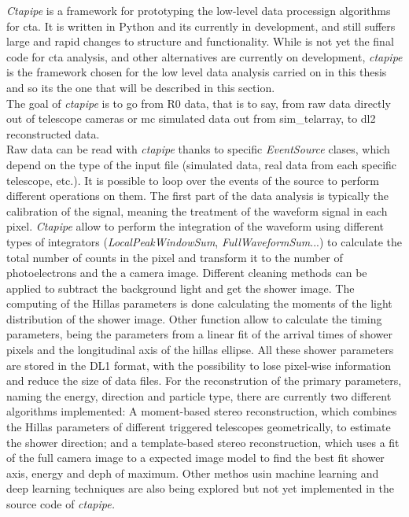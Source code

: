 \documentclass[main.tex]{subfiles}
\begin{document}
\textit{Ctapipe} \cite{ctapipe} is a framework for prototyping the low-level data processign algorithms for \gls{cta}. It is written in Python and its currently in development, and still suffers large and rapid changes to structure and functionality. While is not yet the final code for \gls{cta} analysis, and other alternatives are currently on development, \textit{ctapipe} is the framework chosen for the low level data analysis carried on in this thesis and so its the one that will be described in this section.\\
The goal of \textit{ctapipe} is to go from R0 data, that is to say, from raw data directly out of telescope cameras or \gls{mc} simulated data out from sim\_telarray, to dl2 reconstructed data.\\
Raw data can be read with \textit{ctapipe} thanks to specific \textit{EventSource} clases, which depend on the type of the input file (simulated data, real data from each specific telescope, etc.). It is possible to loop over the events of the source to perform different operations on them. The first part of the data analysis is typically the calibration of the signal, meaning the treatment of the waveform signal in each pixel. \textit{Ctapipe} allow to perform the integration of the waveform using different types of integrators (\textit{LocalPeakWindowSum}, \textit{FullWaveformSum}...) to calculate the total number of counts in the pixel and transform it to the number of photoelectrons and the a camera image. Different cleaning methods can be applied to subtract the background light and get the shower image. The computing of the Hillas parameters is done calculating the moments of the light distribution of the shower image. Other function allow to calculate the timing parameters, being the parameters from a linear fit of the arrival times of shower pixels and the longitudinal axis of the hillas ellipse. All these shower parameters are stored in the DL1 format, with the possibility to lose pixel-wise information and reduce the size of data files. For the reconstrution of the primary parameters, naming the energy, direction and particle type, there are currently two different algorithms implemented: A moment-based stereo reconstruction, which combines the Hillas parameters of different triggered telescopes geometrically, to estimate the shower direction; and a template-based stereo reconstruction, which uses a fit of the full camera image to a expected image model to find the best fit shower axis, energy and deph of maximum. Other methos usin machine learning and deep learning techniques are also being explored but not yet implemented in the source code of \textit{ctapipe.}\\
\end{document}
